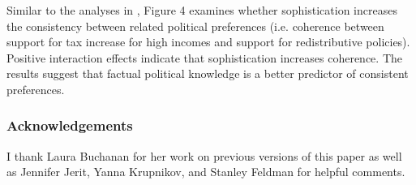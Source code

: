 \documentclass[a0,landscape]{a0poster}
\begin{document}
\begin{multicols}{4}
Similar to the analyses in \citet{prior2014visual}, Figure 4 examines whether sophistication increases the consistency between related political preferences (i.e. coherence between support for tax increase for high incomes and support for redistributive policies). Positive interaction effects indicate that sophistication increases coherence. The results suggest that factual political knowledge is a better predictor of consistent preferences.



\vspace{2em}



\color{Black} %
\begin{tiny}
\setlength{\parskip}{-5pt}


\end{tiny}


\subsubsection*{Acknowledgements}
\setlength{\parskip}{-20pt}
I thank Laura Buchanan for her work on previous versions of this paper as well as Jennifer Jerit, Yanna Krupnikov, and Stanley Feldman for helpful comments.


\end{multicols}
\end{document}
